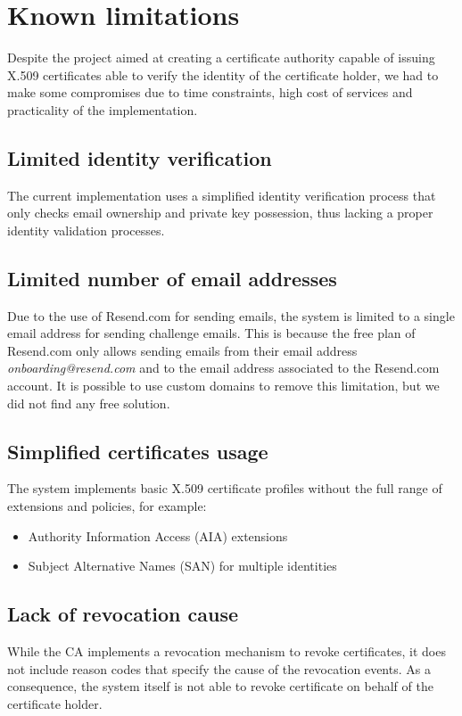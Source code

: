 \chapter{Known limitations}

Despite the project aimed at creating a certificate authority capable of issuing X.509 certificates 
able to verify the identity of the certificate holder, we had to make some compromises due to time
constraints, high cost of services and practicality of the implementation.

\section{Limited identity verification}
The current implementation uses a simplified identity verification process
that only checks email ownership and private key possession, thus lacking a proper identity validation
processes.

\section{Limited number of email addresses}
Due to the use of Resend.com for sending emails, the system is limited to a single email address
for sending challenge emails. This is because the free plan of Resend.com only allows sending emails
from their email address \textit{onboarding@resend.com} and to the email address associated to the Resend.com account.
It is possible to use custom domains to remove this limitation, but we did not find any free solution.

\section{Simplified certificates usage}

The system implements basic X.509 certificate profiles without the full range 
of extensions and policies, for example:
\begin{itemize}
    \item Authority Information Access (AIA) extensions
    \item Subject Alternative Names (SAN) for multiple identities
\end{itemize}

\section{Lack of revocation cause}

While the CA implements a revocation mechanism to revoke certificates, it does not include
reason codes that specify the cause of the revocation events. As a consequence, the system itself
is not able to revoke certificate on behalf of the certificate holder.

